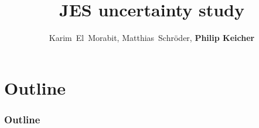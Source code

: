 \documentclass[18pt]{beamer}
\title[JES uncertainty study]{JES uncertainty study}
\author[Philip Keicher]{Karim~El~Morabit, Matthias~Schröder, \textbf{Philip Keicher}}
\institute{Institut für Experimentelle Kernphysik (IEKP)}
\begin{document}


\begin{frame}
\titlepage
\end{frame}

\section*{Outline}
\begin{frame}[label={outline}]
	\frametitle{Outline}
	\tableofcontents
\end{frame}



%





\beginbackup




\backupend
\end{document}
